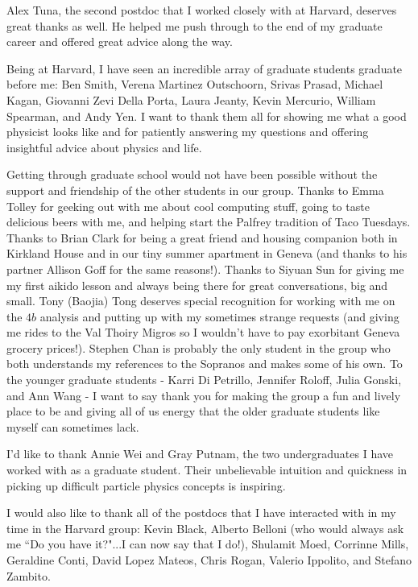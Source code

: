 Alex Tuna, the second postdoc that I worked closely with at Harvard, deserves great thanks as well. He helped me push through to the end of my graduate career and offered great advice along the way. 

Being at Harvard, I have seen an incredible array of graduate students graduate before me: Ben Smith, Verena Martinez Outschoorn, Srivas Prasad, Michael Kagan, Giovanni Zevi Della Porta, Laura Jeanty, Kevin Mercurio, William Spearman, and Andy Yen. I want to thank them all for showing me what a good physicist looks like and for patiently answering my questions and offering insightful advice about physics and life. 

Getting through graduate school would not have been possible without the support and friendship of the other students in our group. Thanks to Emma Tolley for geeking out with me about cool computing stuff, going to taste delicious beers with me, and helping start the Palfrey tradition of Taco Tuesdays. Thanks to Brian Clark for being a great friend and housing companion both in Kirkland House and in our tiny summer apartment in Geneva (and thanks to his partner Allison Goff for the same reasons!). Thanks to Siyuan Sun for giving me my first aikido lesson and always being there for great conversations, big and small. Tony (Baojia) Tong deserves special recognition for working with me on the $4b$ analysis and putting up with my sometimes strange requests (and giving me rides to the Val Thoiry Migros so I wouldn't have to pay exorbitant Geneva grocery prices!). Stephen Chan is probably the only student in the group who both understands my references to the Sopranos and makes some of his own. To the younger graduate students - Karri Di Petrillo, Jennifer Roloff, Julia Gonski, and Ann Wang - I want to say thank you for making the group a fun and lively place to be and giving all of us energy that the older graduate students like myself can sometimes lack. 

I'd like to thank Annie Wei and Gray Putnam, the two undergraduates I have worked with as a graduate student. Their unbelievable intuition and quickness in picking up difficult particle physics concepts is inspiring. 

I would also like to thank all of the postdocs that I have interacted with in my time in the Harvard group: Kevin Black, Alberto Belloni (who would always ask me ``Do you have it?"...I can now say that I do!), Shulamit Moed, Corrinne Mills, Geraldine Conti, David Lopez Mateos, Chris Rogan, Valerio Ippolito, and Stefano Zambito. 

